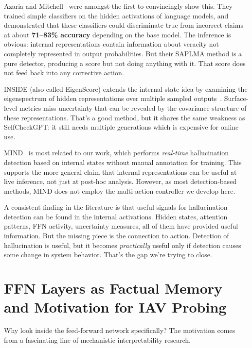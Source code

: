 Azaria and Mitchell~\cite{azaria2023saplma} were amongst the first to convincingly show this.  They trained simple classifiers on the hidden activations of language models, and demonstrated that these classifiers could discriminate true from incorrect claims at about \textbf{71--83\% accuracy} depending on the base model. The inference is obvious: internal representations contain information about veracity not completely represented in output probabilities. But their SAPLMA method is a pure detector, producing a score but not doing anything with it. That score does not feed back into any corrective action.

INSIDE (also called EigenScore) extends the internal-state idea by examining the eigenspectrum of hidden representations over multiple sampled outputs~\cite{chen2024inside}. Surface-level metrics miss uncertainty that can be revealed by the covariance structure of these representations. That's a good method, but it shares the same weakness as SelfCheckGPT: it still needs multiple generations which is expensive for online use.

MIND~\cite{su2024mind} is most related to our work, which performs \emph{real-time} hallucination detection based on internal states without manual annotation for training. This supports the more general claim that internal representations can be useful at live inference, not just at post-hoc analysis. However, as most detection-based methods, MIND does not employ the multi-action controller we develop here.

A consistent finding in the literature is that useful signals for hallucination detection can be found in the internal activations. Hidden states, attention patterns, FFN activity, uncertainty measures, all of them have provided useful information. But the missing piece is the connection to action. Detection of hallucination is useful, but it becomes \emph{practically} useful only if detection causes some change in system behavior. That’s the gap we’re trying to close.

\section{FFN Layers as Factual Memory and Motivation for IAV Probing}
\label{sec:lit_ffn}

Why look inside the feed-forward network specifically? The motivation comes from a fascinating line of mechanistic interpretability research.

